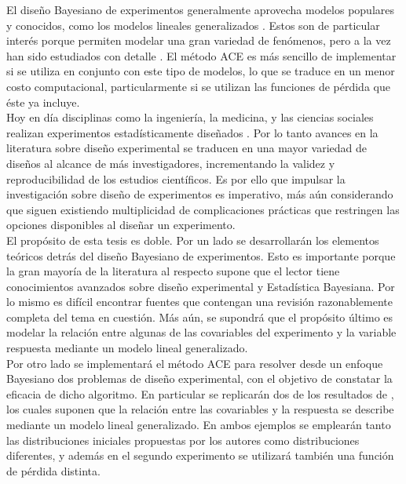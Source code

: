 El diseño Bayesiano de experimentos generalmente aprovecha modelos populares y conocidos, como los modelos lineales generalizados \citep{nelder_wedderburn}. Estos son de particular interés porque permiten modelar una gran variedad de fenómenos, pero a la vez han sido estudiados con detalle \citep{glm_bayesian_view, nelder_glm, montgomery_glm}. El método ACE es más sencillo de implementar si se utiliza en conjunto con este tipo de modelos, lo que se traduce en un menor costo computacional, particularmente si se utilizan las funciones de pérdida que éste ya incluye. \\




Hoy en día disciplinas como la ingeniería, la medicina, y las ciencias sociales realizan experimentos estadísticamente diseñados \citep{fisher_doe, Woods_etal_2006}. Por lo tanto avances en la literatura sobre diseño experimental se traducen en una mayor variedad de diseños al alcance de más investigadores, incrementando la validez y reproducibilidad de los estudios científicos. Es por ello que impulsar la investigación sobre diseño de experimentos es imperativo, más aún considerando que siguen existiendo multiplicidad de complicaciones prácticas que restringen las opciones disponibles al diseñar un experimento. \\ 



El propósito de esta tesis es doble. Por un lado se desarrollarán los elementos teóricos detrás del diseño Bayesiano de experimentos. Esto es importante porque la gran mayoría de la literatura al respecto supone que el lector tiene conocimientos avanzados sobre diseño experimental y Estadística Bayesiana. Por lo mismo es difícil encontrar fuentes que contengan una revisión razonablemente completa del tema en cuestión. Más aún, se supondrá que el propósito último es modelar la relación entre algunas de las covariables del experimento y la variable respuesta mediante un modelo lineal generalizado. \\



Por otro lado se implementará el método ACE para resolver desde un enfoque Bayesiano dos problemas de diseño experimental, con el objetivo de constatar la eficacia de dicho algoritmo. En particular se replicarán dos de los resultados de \cite{Woods_etal}, los cuales suponen que la relación entre las covariables y la respuesta se describe mediante un modelo lineal generalizado. En ambos ejemplos se emplearán tanto las distribuciones iniciales propuestas por los autores como distribuciones diferentes, y además en el segundo experimento se utilizará también una función de pérdida distinta.




